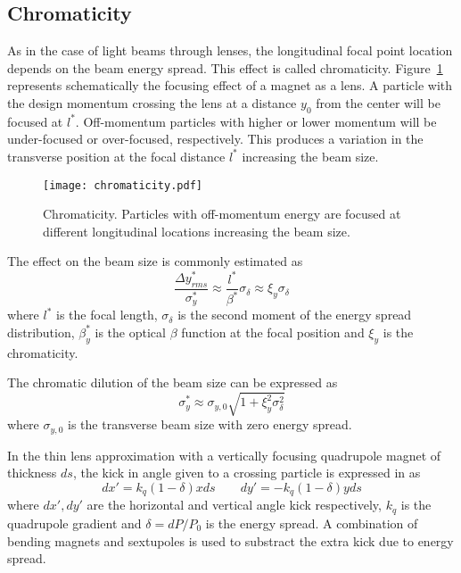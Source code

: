 \subsection{Chromaticity}
As in the case of light beams through lenses, the longitudinal focal point location depends on the beam energy spread. This effect is called chromaticity.  Figure~\ref{f:chrom} represents schematically the focusing effect of a magnet as a lens. A particle with the design momentum crossing the lens at a distance $y_0$ from the center will be focused at $l^*$. Off-momentum particles with higher or lower momentum will be under-focused or over-focused, respectively. This produces a variation in the transverse position at the focal distance $l^*$ increasing the beam size.\par
\begin{figure}[!hbt]
\centering
\texttt{[image: chromaticity.pdf]}\caption{Chromaticity. Particles with off-momentum energy are focused at different longitudinal locations increasing the beam size.}\label{f:chrom}
\end{figure}
The effect on the beam size is commonly estimated as
\begin{equation}
 \frac{\Delta y^*_{rms}}{\sigma^*_y}\approx\frac{l^*}{\beta^*}\sigma_\delta\approx\xi_y\sigma_\delta
\end{equation}
where $l^*$ is the focal length, $\sigma_\delta$ is the second moment of the energy spread distribution, $\beta_y^*$ is the optical $\beta$ function at the focal position and $\xi_y$ is the chromaticity.\par
The chromatic dilution of the beam size can be expressed as 
\begin{equation}
 \sigma^*_y\approx\sigma_{y,0}\sqrt{1+\xi_y^2\sigma^2_\delta}
\end{equation}
where $\sigma_{y,0}$ is the transverse beam size with zero energy spread.\par
In the thin lens approximation with a vertically focusing quadrupole magnet of thickness $ds$, the kick in angle given to a crossing particle is expressed in \cite{CAS9104} as
\begin{equation}
 dx'=k_q(1-\delta)xds\qquad dy'=-k_q(1-\delta)yds
\end{equation}
where $dx', dy'$ are the horizontal and vertical angle kick respectively, $k_q$ is the quadrupole gradient and $\delta=dP/P_0$ is the energy spread. A combination of bending magnets and sextupoles is used to substract the extra kick due to energy spread.\par
